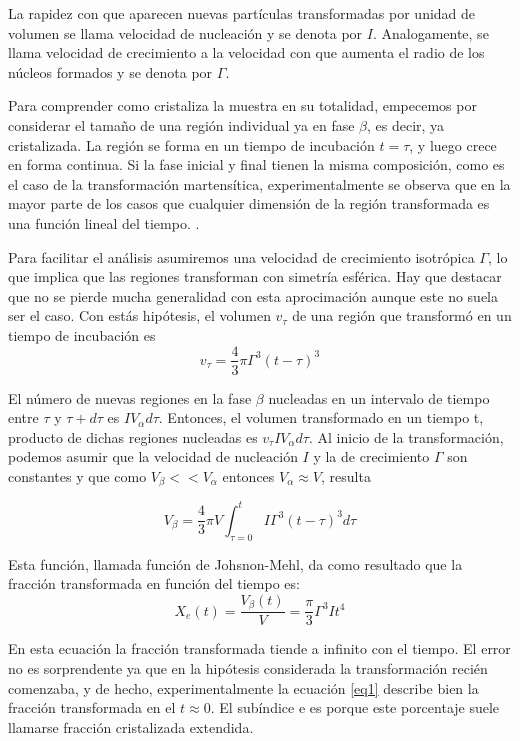 \documentclass{article}
\theoremstyle{definition}
\theoremstyle{remark}
\begin{document}
La rapidez con que aparecen nuevas partículas transformadas por unidad de volumen se llama velocidad de nucleación y se denota por $I$. Analogamente, se llama velocidad de crecimiento a la velocidad con que aumenta el radio de los núcleos formados y se denota por $\Gamma$.

Para comprender como cristaliza la muestra en su totalidad, empecemos por
considerar el tamaño de una región individual ya en fase $\beta$, es decir, ya cristalizada. La región se forma en un tiempo de incubación $t=\tau$, y luego crece en forma continua. Si la fase inicial y final tienen la misma composición, como es el caso de la transformación martensítica, experimentalmente se observa que en la mayor parte de los casos que cualquier dimensión de la región transformada es una función lineal del tiempo. .

Para facilitar el análisis asumiremos una velocidad de crecimiento isotrópica $\Gamma$, lo que implica que las regiones transforman con simetría esférica. Hay que destacar que no se pierde mucha generalidad con esta aprocimación aunque este no suela ser el caso. Con estás hipótesis, el volumen $v_\tau$ de una región que transformó en un tiempo de incubación es 
\begin{equation}
	v_\tau = \frac{4}{3}\pi \Gamma^3(t-\tau)^3
\end{equation}

El número de nuevas regiones en la fase $\beta$ nucleadas en un intervalo de tiempo entre $\tau$ y $\tau + d\tau$ es $IV_\alpha d\tau$. Entonces, el volumen transformado en un tiempo t, producto de dichas regiones nucleadas es $v_\tau IV_\alpha d\tau$. Al inicio de la transformación, podemos asumir que la velocidad de nucleación $I$ y la de crecimiento $\Gamma$ son constantes y que como $V_\beta << V_\alpha$ entonces $V_\alpha \approx V$, resulta

\begin{equation}
\label{integral}
	V_\beta = \frac{4}{3}\pi V \int_{\tau = 0}^{t} I\Gamma^3(t-\tau)^3d\tau
\end{equation}

Esta función, llamada función de Johsnon-Mehl, da como resultado que la fracción transformada en función del tiempo es:
\begin{equation}
\label{eq1}
	X_e(t) = \frac{V_\beta (t)}{V} = \frac{\pi}{3}\Gamma^3 I t^4
\end{equation}

En esta ecuación la fracción transformada tiende a infinito con el tiempo. El error no es sorprendente ya que en la hipótesis considerada la transformación recién comenzaba, y de hecho, experimentalmente la ecuación \ref{eq1} describe bien la fracción transformada en el $t \approx 0$. El subíndice e es porque este porcentaje suele llamarse fracción cristalizada extendida.
\end{document}
